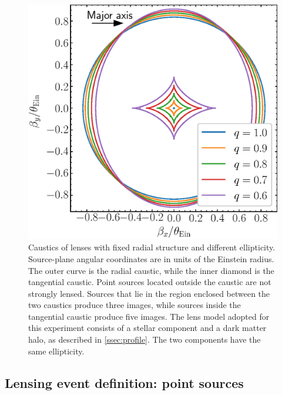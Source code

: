 \documentclass{aa}
\begin{document}
\begin{figure}
\includegraphics[width=\columnwidth]{composite_caustics.eps}
\caption{
Caustics of lenses with fixed radial structure and different ellipticity.
Source-plane angular coordinates are in units of the Einstein radius.
The outer curve is the radial caustic, while the inner diamond is the tangential caustic. Point sources located outside the caustic are not strongly lensed. Sources that lie in the region enclosed between the two caustics produce three images, while sources inside the tangential caustic produce five images.
The lens model adopted for this experiment consists of a stellar component and a dark matter halo, as described in \ref{ssec:profile}. The two components have the same ellipticity.
\label{fig:ellcaust}
}
\end{figure}

\subsection{Lensing event definition: point sources}\label{ssec:lensdefpoint}
\end{document}
